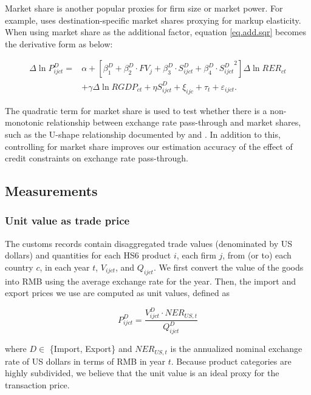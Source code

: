 \documentclass[12pt]{article}
\begin{document}
Market share is another popular proxies for firm size or market power. For example, \cite{aik2014} uses destination-specific market shares proxying for markup elasticity. When using market share as the additional factor, equation \ref{eq.add.sqr} becomes the derivative form as below:

\begin{equation}
	\begin{aligned}
	\Delta \ln P^{D}_{ijct}=&\alpha+[\beta^D_{1}+ \beta^D_{2} \cdot FV_{j}+\beta^D_{3} \cdot S^{D}_{ijct}+\beta^D_4 \cdot {S^{D}_{ijct}}^2] \Delta \ln RER_{ct} \\
	&+\gamma \Delta \ln RGDP_{ct}+ \eta S^{D}_{ijct}+\xi_{ijc}+\tau_{t} +\varepsilon_{ijct}.
	\end{aligned}
	\label{eq.add.sqr}
\end{equation}

The quadratic term for market share is used to test whether there is a non-monotonic relationship between exchange rate pass-through and market shares, such as the U-shape relationship documented by \cite{garetto2016} and \cite{devereux2017}. In addition to this, controlling for market share improves our estimation accuracy of the effect of credit constraints on exchange rate pass-through.

\subsection{Measurements} \label{Framework-Measurements}

\subsubsection{Unit value as trade price}

The customs records contain disaggregated trade values (denominated by US dollars) and quantities for each HS6 product $i$, each firm $j$, from (or to) each country $c$, in each year $t$, $V_{ijct}$, and $Q_{ijct}$. We first convert the value of the goods into RMB using the average exchange rate for the year. Then, the import and export prices we use are computed as unit values, defined as 

$$
P^{D}_{ijct}=\frac{V^{D}_{ijct}\cdot NER_{US,t}}{Q^{D}_{ijct}}
$$

where $D \in$ \{Import, Export\} and $NER_{US,t}$ is the annualized nominal exchange rate of US dollars in terms of RMB in year $t$. Because product categories are highly subdivided, we believe that the unit value is an ideal proxy for the transaction price.
\end{document}
